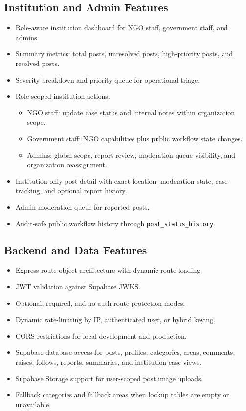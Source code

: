 \documentclass[11pt,a4paper]{article}
\begin{document}
\subsection{Institution and Admin Features}
\begin{itemize}
  \item Role-aware institution dashboard for NGO staff, government staff, and admins.
  \item Summary metrics: total posts, unresolved posts, high-priority posts, and resolved posts.
  \item Severity breakdown and priority queue for operational triage.
  \item Role-scoped institution actions:
  \begin{itemize}
    \item NGO staff: update case status and internal notes within organization scope.
    \item Government staff: NGO capabilities plus public workflow state changes.
    \item Admins: global scope, report review, moderation queue visibility, and organization reassignment.
  \end{itemize}
  \item Institution-only post detail with exact location, moderation state, case tracking, and optional report history.
  \item Admin moderation queue for reported posts.
  \item Audit-safe public workflow history through \texttt{post\_status\_history}.
\end{itemize}

\subsection{Backend and Data Features}
\begin{itemize}
  \item Express route-object architecture with dynamic route loading.
  \item JWT validation against Supabase JWKS.
  \item Optional, required, and no-auth route protection modes.
  \item Dynamic rate-limiting by IP, authenticated user, or hybrid keying.
  \item CORS restrictions for local development and production.
  \item Supabase database access for posts, profiles, categories, areas, comments, raises, follows, reports, summaries, and institution case views.
  \item Supabase Storage support for user-scoped post image uploads.
  \item Fallback categories and fallback areas when lookup tables are empty or unavailable.
\end{itemize}
\end{document}
